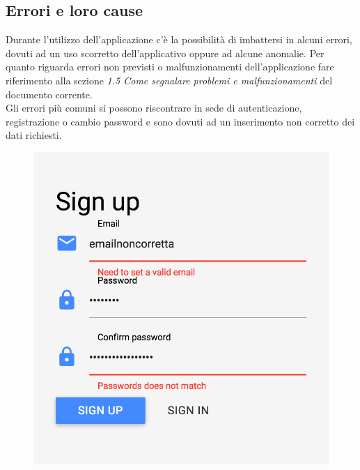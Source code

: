 \subsection{Errori e loro cause}
Durante l'utilizzo dell'applicazione c'è la possibilità di imbattersi in alcuni errori, dovuti ad un uso scorretto dell'applicativo oppure ad alcune anomalie. Per quanto riguarda errori non previsti o malfunzionamenti dell'applicazione fare riferimento alla sezione \emph{1.5 Come segnalare problemi e malfunzionamenti} del documento corrente.\\

Gli errori più comuni si possono riscontrare in sede di autenticazione, registrazione o cambio password e sono dovuti ad un inserimento non corretto dei dati richiesti.

\begin{figure}[!h]
\begin{center}
\includegraphics[scale=0.4]{img/signup_error.png}%
\qquad\qquad

\end{center}
\end{figure}
